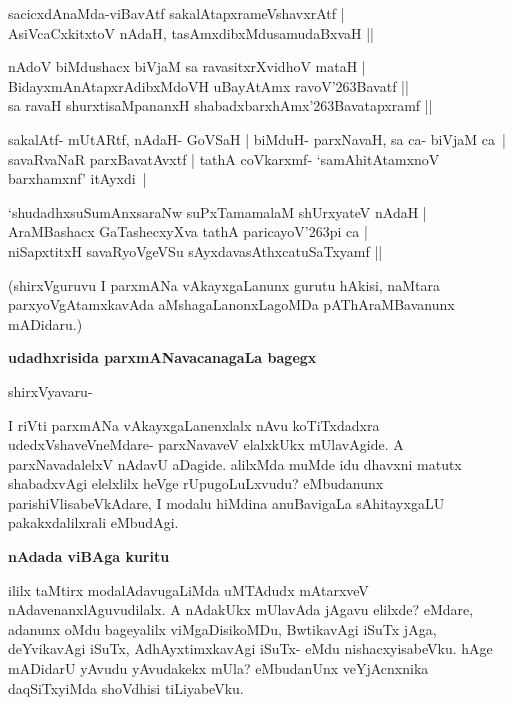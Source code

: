 \begin{itemize}
{\bf 
\item[1.] sacicxdAnaMda-viBavAtf sakalAtapxrameVshavxrAtf |\\\label{157d}
AsiVcaCxkitxtoV nAdaH, tasAmxdibxMdusamudaBxvaH ||
\item[2.] nAdoV biMdushacx biVjaM sa ravasitxrXvidhoV mataH |\\
BidayxmAnAtapxrAdibxMdoVH uBayAtAmx ravoV\char'263Bavatf ||\\
sa ravaH shurxtisaMpananxH shabadxbarxhAmx\char'263Bavatapxramf ||}
\end{itemize}

\begin{artha}
sakalAtf- mUtARtf, nAdaH- GoVSaH | biMduH- parxNavaH, sa ca- biVjaM ca~| savaRvaNaR parxBava\-tAvxtf | tathA coVkarxmf- `samAhitAtamxnoV barxhamxnf' itAyxdi~|
\end{artha}

\begin{shloka}
`shudadhxsuSumAnxsaraNw suPxTamamalaM shUrxyateV nAdaH |\\\label{157e}
AraMBashacx GaTashecxyXva tathA paricayoV\char'263pi ca |\\\label{157f}
niSapxtitxH savaRyoVgeVSu sAyxdavasAthxcatuSaTxyamf ||
\end{shloka}

\noindent
(shirxVguruvu I parxmANa vAkayxgaLanunx gurutu hAkisi, naMtara parxyoVgAtamxkavAda aMshagaLanonxLa\-goMDa pAThAraMBavanunx mADidaru.)

{\bigskip
\noindent
{\large\bf udadhxrisida parxmANavacanagaLa bagegx}}\label{page158}
\medskip

\noindent
shirxVyavaru- 

I riVti parxmANa vAkayxgaLanenxlalx nAvu koTiTxdadxra udedxVshaveVneMdare- parxNavaveV elalxkUkx mUlavAgide. A parxNavadalelxV nAdavU aDagide. alilxMda muMde idu dhavxni matutx shabadxvAgi elelxlilx heVge rUpugoLuLxvudu? eMbu\-danunx parishiVlisabeVkAdare, I modalu hiMdina anuBavigaLa sAhitayxgaLU pakakxdalilxrali eMbudAgi.

{\bigskip
\noindent
{\large\bf nAdada viBAga kuritu}}\label{page158}
\medskip

\noindent
ililx taMtirx modalAdavugaLiMda uMTAdudx mAtarxveV nAdavenanxlAguvudilalx. A nAdakUkx mUla\-vAda jAgavu elilxde? eMdare, adanunx oMdu bageyalilx viMgaDisikoMDu, BwtikavAgi iSuTx jAga, deYvika\-vAgi iSuTx, AdhAyxtimxkavAgi iSuTx- eMdu nishacxyisabeVku. hAge mADidarU yAvudu yAvudakekx mUla? eMbudanUnx veYjAcnxnika daqSiTxyiMda shoVdhisi tiLiyabeVku.

